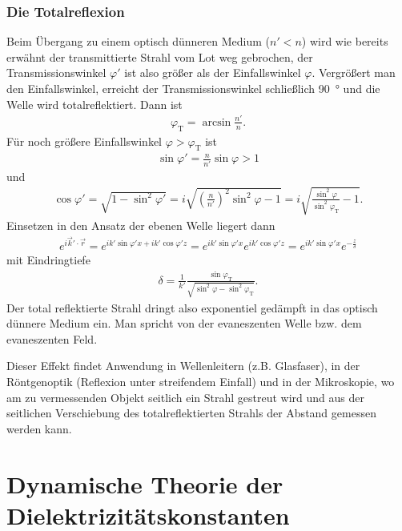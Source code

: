 \subsubsection{Die Totalreflexion}

Beim Übergang zu einem optisch dünneren Medium ($n'<n$) wird wie bereits erwähnt der transmittierte Strahl vom Lot weg gebrochen, der Transmissionswinkel $\varphi'$ ist also größer als der Einfallswinkel $\varphi$.
Vergrößert man den Einfallswinkel, erreicht der Transmissionswinkel schließlich \SI{90}{\degree} und die Welle wird totalreflektiert.
Dann ist
\begin{align}
    \label{eq:totalreflexion}
    \varphi_\mathrm{T} = \arcsin\frac{n'}{n}.
\end{align}
Für noch größere Einfallswinkel $\varphi>\varphi_\mathrm{T}$ ist
\begin{align*}
    \sin\varphi'=\frac{n}{n'}\sin\varphi>1
\end{align*}
und
\begin{align*}
    \cos\varphi'=\sqrt{1-\sin^2\varphi'}=i\sqrt{\left(\frac{n}{n'}\right)^2\sin^2\varphi-1}=i\sqrt{\frac{\sin^2\varphi}{\sin^2\varphi_\mathrm{T}}-1}.
\end{align*}
Einsetzen in den Ansatz der ebenen Welle liegert dann
\begin{align*}
    e^{i\vec k'\cdot \vec r} = e^{ik' \sin\varphi' x+ik'\cos\varphi' z}  = e^{ik' \sin\varphi' x}e^{ik'\cos\varphi' z} = e^{ik' \sin\varphi' x}e^{-\frac{z}{\delta}}
\end{align*}
mit Eindringtiefe
\begin{align*}
    \delta=\frac{1}{k'} \frac{\sin\varphi_\mathrm{T}}{\sqrt{\sin^2\varphi-\sin^2\varphi_\mathrm{T}}}.
\end{align*}
Der total reflektierte Strahl dringt also exponentiel gedämpft in das optisch dünnere Medium ein. Man spricht von der evaneszenten Welle bzw. dem evaneszenten Feld.

Dieser Effekt findet Anwendung in Wellenleitern (z.B. Glasfaser), in der Röntgenoptik (Reflexion unter streifendem Einfall) und in der Mikroskopie,
wo am zu vermessenden Objekt seitlich ein Strahl gestreut wird und aus der seitlichen Verschiebung des totalreflektierten Strahls der Abstand gemessen werden kann.




\section{Dynamische Theorie der Dielektrizitätskonstanten}

